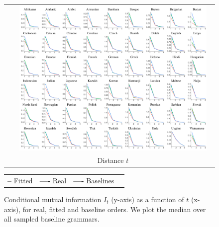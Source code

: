 \begin{figure}
	\begin{tabular}{lc}
	\rotatebox{90}{\ \ \ \ \ \ \ \ \ \ \ \ \ \ \ \ \ Conditional Mutual Information $I_t$ (bits)} &
\includegraphics[width=0.95\textwidth]{it-table-mle.pdf}
\\
		&	Distance $t$
	\end{tabular}

\begin{center}
\begin{tabular}{llll}
\textbf{\textcolor{fitted}{--}} Fitted&
\textbf{\textcolor{real}{----}} Real&
\textbf{\textcolor{baseline}{----}} Baselines&
\end{tabular}
\end{center}
\caption{Conditional mutual information $I_t$ (y-axis) as a function of $t$ (x-axis), for real, fitted and baseline orders. We plot the median over all sampled baseline grammars.}\label{fig:it}
\end{figure}



